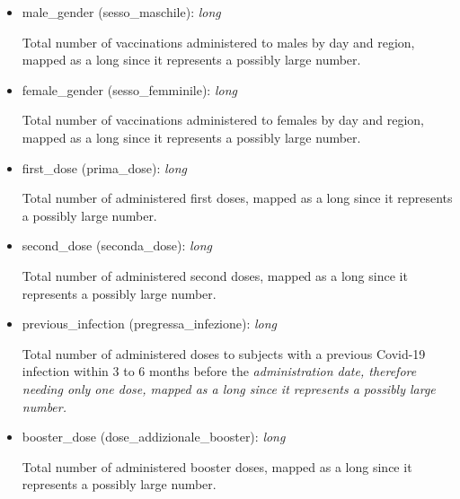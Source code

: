 \documentclass[12pt, a4paper]{article}
\begin{document}
\begin{itemize}
\begin{itemize}
      \item male\_gender (sesso\_maschile): \emph{long} \\
        \begin{footnotesize}
          Total number of vaccinations administered to males by day and region, mapped as
          a long since it represents a possibly large number.
        \end{footnotesize}
      \item female\_gender (sesso\_femminile): \emph{long} \\
        \begin{footnotesize}
          Total number of vaccinations administered to females by day and region, mapped
          as a long since it represents a possibly large number.
        \end{footnotesize}
      \item first\_dose (prima\_dose): \emph{long} \\
        \begin{footnotesize}
          Total number of administered first doses, mapped as a long since it represents
          a possibly large number.
        \end{footnotesize}
      \item second\_dose (seconda\_dose): \emph{long} \\
        \begin{footnotesize}
          Total number of administered second doses, mapped as a long since it represents
          a possibly large number.
        \end{footnotesize}
      \item previous\_infection (pregressa\_infezione): \emph{long} \\
        \begin{footnotesize}
          Total number of administered doses to subjects with a previous Covid-19 
          infection within 3 to 6 months before the \it{administration date}, therefore 
          needing only one dose, mapped as a long since it represents a possibly large 
          number. 
        \end{footnotesize}
      \item booster\_dose (dose\_addizionale\_booster): \emph{long} \\
        \begin{footnotesize}
          Total number of administered booster doses, mapped as a long since it 
          represents a possibly large number.
        \end{footnotesize}

\end{itemize}
\end{itemize}
\end{document}
